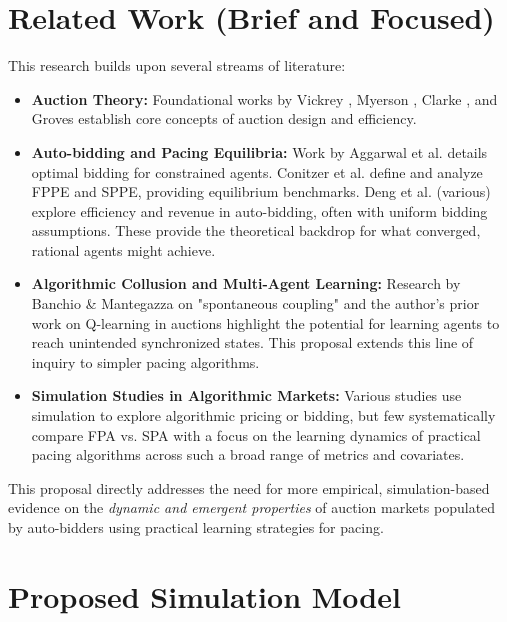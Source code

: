 \documentclass[12pt, a4paper]{article}
\begin{document}
\section{Related Work (Brief and Focused)}
This research builds upon several streams of literature:
\begin{itemize}
    \item \textbf{Auction Theory:} Foundational works by Vickrey \cite{Vickrey1961}, Myerson \cite{Myerson1981}, Clarke \cite{Clarke1971}, and Groves \cite{Groves1973} establish core concepts of auction design and efficiency.
    \item \textbf{Auto-bidding and Pacing Equilibria:} Work by Aggarwal et al. \cite{Aggarwal2019, Aggarwal2024Survey} details optimal bidding for constrained agents. Conitzer et al. \cite{Conitzer2021SPPE, Conitzer2022FPPE} define and analyze FPPE and SPPE, providing equilibrium benchmarks. Deng et al. (various) explore efficiency and revenue in auto-bidding, often with uniform bidding assumptions. These provide the theoretical backdrop for what converged, rational agents might achieve.
    \item \textbf{Algorithmic Collusion and Multi-Agent Learning:} Research by Banchio \& Mantegazza \cite{BanchioMantegazza2022} on "spontaneous coupling" and the author's prior work on Q-learning in auctions \cite{Rawat2025AlgorithmicCollusion} highlight the potential for learning agents to reach unintended synchronized states. This proposal extends this line of inquiry to simpler pacing algorithms.
    \item \textbf{Simulation Studies in Algorithmic Markets:} Various studies use simulation to explore algorithmic pricing or bidding, but few systematically compare FPA vs. SPA with a focus on the learning dynamics of practical pacing algorithms across such a broad range of metrics and covariates.
\end{itemize}
This proposal directly addresses the need for more empirical, simulation-based evidence on the \textit{dynamic and emergent properties} of auction markets populated by auto-bidders using practical learning strategies for pacing.

\section{Proposed Simulation Model} \label{sec:simulation_model}
\end{document}
